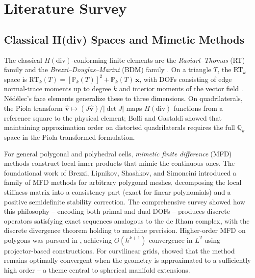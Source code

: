 
\section{Literature Survey}

\subsection{Classical H(div) Spaces and Mimetic Methods}

The classical $H(\mathrm{div})$-conforming finite elements are the
\emph{Raviart--Thomas} (RT) family \cite{RaviartThomas1977} and the
\emph{Brezzi--Douglas--Marini} (BDM) family \cite{bdm1985}.  On a triangle
$T$, the RT$_k$ space is $\mathrm{RT}_k(T) = [\mathbb{P}_k(T)]^2 +
\mathbb{P}_k(T)\,\mathbf{x}$, with DOFs consisting of edge normal-trace
moments up to degree $k$ and interior moments of the vector field
\cite{BrezziFortin1991,BoffiBrezziFortin2013}.  N\'{e}d\'{e}lec's face
elements \cite{Nedelec1980,nedelec1986} generalize these to three dimensions.
On quadrilaterals, the Piola transform $\hat{\mathbf{v}} \mapsto
(J\hat{\mathbf{v}})/|\det J|$ maps $H(\mathrm{div})$ functions from a
reference square to the physical element; Boffi and Gastaldi
\cite{boffi2002remarks} showed that maintaining approximation order on
distorted quadrilaterals requires the full $\mathbb{Q}_k$ space in the
Piola-transformed formulation.

For general polygonal and polyhedral cells, \emph{mimetic finite difference}
(MFD) methods construct local inner products that mimic the continuous ones.
The foundational work of Brezzi, Lipnikov, Shashkov, and Simoncini
\cite{brezzi2005family} introduced a family of MFD methods for arbitrary
polygonal meshes, decomposing the local stiffness matrix into a consistency
part (exact for linear polynomials) and a positive semidefinite stability
correction.  The comprehensive survey \cite{lipnikov2014mimetic} showed how
this philosophy -- encoding both primal and dual DOFs -- produces discrete
operators satisfying exact sequences analogous to the de Rham complex,
with the discrete divergence theorem holding to machine precision.
Higher-order MFD on polygons was pursued in \cite{beiraoMFDhigh2014},
achieving $O(h^{k+1})$ convergence in $L^2$ using projector-based
constructions.  For curvilinear grids, \cite{lipnikov2014curvilinear} showed
that the method remains optimally convergent when the geometry is
approximated to a sufficiently high order -- a theme central to spherical
manifold extensions.

